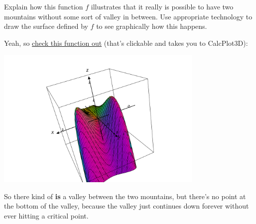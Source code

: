 \documentclass[10pt]{article}
\newenvironment{red}{\color{red}}{\ignorespacesafterend}
\begin{document}
\begin{enumerate}[leftmargin=0pt]
    Explain how this function $f$ illustrates that it really is possible to have two mountains without some sort of valley in between. Use appropriate technology to draw the surface defined by $f$ to see graphically how this happens.
    
    \begin{red}
    Yeah, so \href{https://www.monroecc.edu/faculty/paulseeburger/calcnsf/CalcPlot3D/?type=z;z=4x^2e^y-2x^4-e^(4y);visible=true;umin=-2;umax=2;vmin=-2;vmax=2;grid=50;format=normal;alpha=-1;constcol=rgb(255,0,0);view=0;contourcolor=red;fixdomain=false&type=window;hsrmode=3;nomidpts=true;anaglyph=-1;center=2.507369696231452,8.657081705234903,4.332208854072867,1;focus=0,0,0,1;up=-0.3279946341240409,-0.34507444582480573,0.8793993102251901,1;transparent=false;alpha=140;twoviews=false;unlinkviews=false;axisextension=0.7;xaxislabel=x;yaxislabel=y;zaxislabel=z;edgeson=true;faceson=true;showbox=true;showaxes=true;showticks=true;perspective=true;centerxpercent=0.5;centerypercent=0.5;rotationsteps=30;autospin=true;xygrid=false;yzgrid=false;xzgrid=false;gridsonbox=true;gridplanes=false;gridcolor=rgb(128,128,128);xmin=-2;xmax=2;ymin=-2;ymax=2;zmin=-2;zmax=2;xscale=1;yscale=1;zscale=1;zcmin=-4;zcmax=4;zoom=0.886667;xscalefactor=1;yscalefactor=1;zscalefactor=1}{check this function out} (that's clickable and takes you to CalcPlot3D):
    
    \begin{center}
        \includegraphics[width=0.75\textwidth]{203-keys/ps8-answer-key/CalcPlot3D-plot.png}
    \end{center}
    
    So there kind of \textbf{is} a valley between the two mountains, but there's no point at the bottom of the valley, because the valley just continues down forever without ever hitting a critical point.
    \end{red}
    \end{enumerate}
\end{document}
